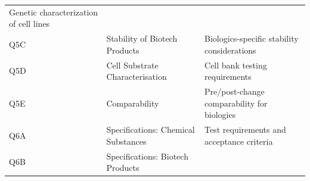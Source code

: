 \documentclass[
  11pt,
  a4paper,
]{report}
\begin{document}
\begin{longtable}[]{@{}lll@{}}
\begin{minipage}[t]{0.41\columnwidth}
Genetic characterization of cell lines\strut
\end{minipage}\tabularnewline
\begin{minipage}[t]{0.30\columnwidth}\raggedright
Q5C\strut
\end{minipage} & \begin{minipage}[t]{0.19\columnwidth}\raggedright
Stability of Biotech Products\strut
\end{minipage} & \begin{minipage}[t]{0.41\columnwidth}\raggedright
Biologics-specific stability considerations\strut
\end{minipage}\tabularnewline
\begin{minipage}[t]{0.30\columnwidth}\raggedright
Q5D\strut
\end{minipage} & \begin{minipage}[t]{0.19\columnwidth}\raggedright
Cell Substrate Characterisation\strut
\end{minipage} & \begin{minipage}[t]{0.41\columnwidth}\raggedright
Cell bank testing requirements\strut
\end{minipage}\tabularnewline
\begin{minipage}[t]{0.30\columnwidth}\raggedright
Q5E\strut
\end{minipage} & \begin{minipage}[t]{0.19\columnwidth}\raggedright
Comparability\strut
\end{minipage} & \begin{minipage}[t]{0.41\columnwidth}\raggedright
Pre/post-change comparability for biologics\strut
\end{minipage}\tabularnewline
\begin{minipage}[t]{0.30\columnwidth}\raggedright
Q6A\strut
\end{minipage} & \begin{minipage}[t]{0.19\columnwidth}\raggedright
Specifications: Chemical Substances\strut
\end{minipage} & \begin{minipage}[t]{0.41\columnwidth}\raggedright
Test requirements and acceptance criteria\strut
\end{minipage}\tabularnewline
\begin{minipage}[t]{0.30\columnwidth}\raggedright
Q6B\strut
\end{minipage} & \begin{minipage}[t]{0.19\columnwidth}\raggedright
Specifications: Biotech Products\strut
\end{minipage} & \begin{minipage}[t]{0.41\columnwidth}\raggedright

\end{minipage}
\end{longtable}
\end{document}
